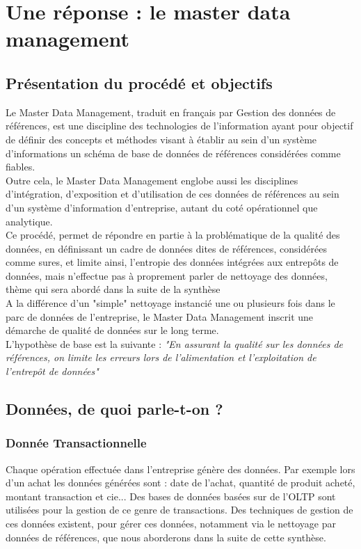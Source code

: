 \section{Une réponse : le master data management}

\subsection{Présentation du procédé et objectifs} 

Le Master Data Management, traduit en français par Gestion des données de références, est une discipline des technologies de l'information ayant pour objectif de définir des concepts et méthodes visant à établir au sein d'un système d'informations un schéma de base de données de références considérées comme fiables.\\
Outre cela, le Master Data Management englobe aussi les disciplines d'intégration, d'exposition et d'utilisation de ces données de références au sein d'un système d'information d'entreprise, autant du coté opérationnel que analytique.\\
Ce procédé, permet de répondre en partie à la problématique de la qualité des données, en définissant un cadre de données dites de références, considérées comme sures, et limite ainsi, l'entropie des données intégrées aux entrepôts de données, mais n'effectue pas à proprement parler de nettoyage des données, thème qui sera abordé dans la suite de la synthèse\\
A la différence d'un "simple" nettoyage instancié une ou plusieurs fois dans le parc de données de l'entreprise, le Master Data Management inscrit une démarche de qualité de données sur le long terme.\\

L'hypothèse de base est la suivante : \textit{"En assurant la qualité sur les données de références, on limite les erreurs lors de l'alimentation et l'exploitation de l'entrepôt de données"}\\

\subsection{Données, de quoi parle-t-on ?}

\subsubsection{Donnée Transactionnelle}

Chaque opération effectuée dans l'entreprise génère des données. Par exemple lors d'un achat
les données générées sont : date de l'achat, quantité de produit acheté, montant transaction et cie...
Des bases de données basées sur de l'OLTP sont utilisées pour la gestion de ce genre de transactions.
Des techniques de gestion de ces données existent, pour gérer ces données, notamment via le nettoyage par données de références, que nous aborderons dans la suite de cette synthèse.

